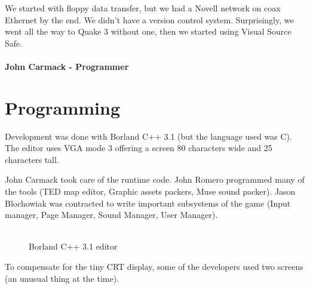 \documentclass[book.tex]{subfiles}
\begin{document}
 \begin{fancyquotes}
We started with floppy data transfer, but we had a Novell network on coax Ethernet by the end. We didn't have a version control system.  Surprisingly, we went all the way to Quake 3 without one, then we started using Visual Source Safe.\\
 \\
\textbf{John Carmack - Programmer}
\end{fancyquotes}


























\section{Programming}



Development was done with Borland C++ 3.1 (but the language used was C). The editor uses VGA mode 3 offering a screen 80 characters wide and 25 characters tall.\\
\par
John Carmack took care of the runtime code. John Romero programmed many of the tools (TED map editor, Graphic assets packers, Muse sound packer). Jason Blochowiak was contracted to write important subsystems of the game (Input manager, Page Manager, Sound Manager, User Manager).\\
\\
\begin{figure}[H]
\centering
\caption{Borland C++ 3.1 editor}
\end{figure}


To compensate for the tiny CRT display, some of the developers used two screens (an unusual thing at the time).\\
\end{document}
